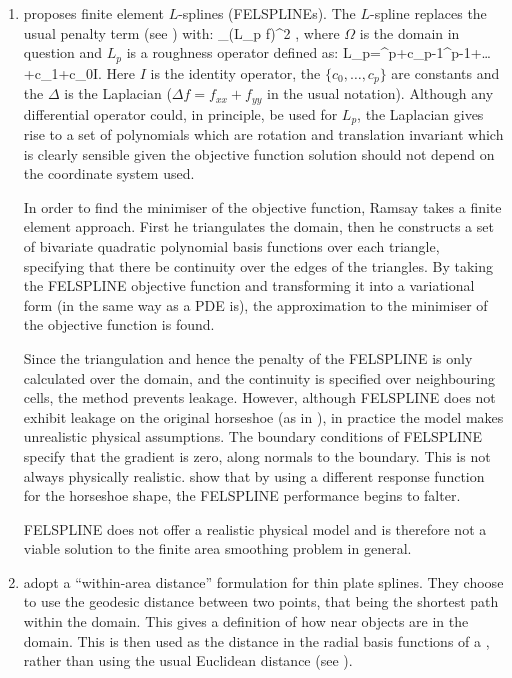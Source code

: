 \begin{enumerate}
\item \cite{ramsay} proposes finite element $L$-splines (FELSPLINEs). The $L$-spline replaces the usual penalty term (see ) with:
\be
\int_\Omega (L_p f)^2 \Omega,
\ee
where $\Omega$ is the domain in question and $L_p$ is a roughness operator defined as:
\be
L_p=\Delta^p+c_{p-1}\Delta^{p-1}+\dots+c_1\Delta+c_0I.
\ee
Here $I$ is the identity operator, the $\{c_0,\dots, c_p\}$ are constants and the $\Delta$ is the Laplacian ($\Delta f = f_{xx}+f_{yy}$ in the usual notation). Although any differential operator could, in principle, be used for $L_p$, the Laplacian gives rise to a set of polynomials which are rotation and translation invariant which is clearly sensible given the objective function solution should not depend on the coordinate system used.

In order to find the minimiser of the objective function, Ramsay takes a finite element approach. First he triangulates the domain, then he constructs a set of bivariate quadratic polynomial basis functions over each triangle, specifying that there be continuity over the edges of the triangles. By taking the FELSPLINE objective function and transforming it into a variational form (in the same way as a PDE is), the approximation to the minimiser of the objective function is found. 

Since the triangulation and hence the penalty of the FELSPLINE is only calculated over the domain, and the continuity is specified over neighbouring cells, the method prevents leakage. However, although FELSPLINE does not exhibit leakage on the original horseshoe (as in ), in practice the model makes unrealistic physical assumptions. The boundary conditions of FELSPLINE specify that the gradient is zero, along normals to the boundary. This is not always physically realistic. \cite{soap} show that by using a different response function for the horseshoe shape, the FELSPLINE performance begins to falter.

FELSPLINE does not offer a realistic physical model and is therefore not a viable solution to the finite area smoothing problem in general.

\item \cite{wangranalli} adopt a ``within-area distance'' formulation for thin plate splines. They choose to use the geodesic distance between two points, that being the shortest path within the domain. This gives a definition of how near objects are in the domain. This is then used as the distance in the radial basis functions of a \tprs, rather than using the usual Euclidean distance (see ).


\end{enumerate}
